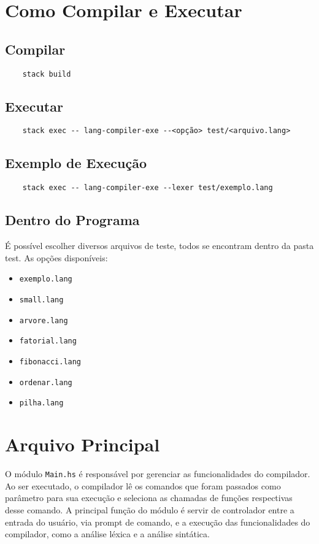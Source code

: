 \documentclass{article}
\begin{document}
\section{Como Compilar e Executar}
\subsection{Compilar}
\begin{verbatim}
    stack build
\end{verbatim}

\subsection{Executar}
\begin{verbatim}
    stack exec -- lang-compiler-exe --<opção> test/<arquivo.lang>
\end{verbatim}

\subsection{Exemplo de Execução}
\begin{verbatim}
    stack exec -- lang-compiler-exe --lexer test/exemplo.lang
\end{verbatim}

\subsection{Dentro do Programa}
É possível escolher diversos arquivos de teste, todos se encontram dentro da pasta test. As opções disponíveis:
\begin{itemize}
    \item \texttt{exemplo.lang}
    \item \texttt{small.lang}
    \item \texttt{arvore.lang}
    \item \texttt{fatorial.lang}
    \item \texttt{fibonacci.lang}
    \item \texttt{ordenar.lang}
    \item \texttt{pilha.lang}
\end{itemize}

\section{Arquivo Principal}

O módulo \texttt{Main.hs} é responsável por gerenciar as funcionalidades do compilador. Ao ser executado, o compilador lê os comandos que foram passados como parâmetro para sua execução e seleciona as chamadas de funções respectivas desse comando. A principal função do módulo é servir de controlador entre a entrada do usuário, via prompt de comando, e a execução das funcionalidades do compilador, como a análise léxica e a análise sintática.
\end{document}

